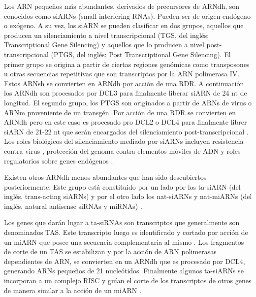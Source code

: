 Los ARN pequeños más abundantes, derivados de precursores de ARNdh, son conocidos como siARNs (small interfering RNAs). 
Pueden ser de origen endógeno o exógeno.
A su vez, los siARN se pueden clasificar en dos grupos, aquellos que producen un silenciamiento a nivel transcripcional (TGS, del inglés: Transcriptional Gene Silencing) \citep{pmid17943195, Voinnet2009669} y aquellos que lo producen a nivel post-transcripcional (PTGS, del inglés: Post Transcriptional Gene Silencing)\citep{pmid10542148}. 
El primer grupo se origina a partir de ciertas regiones genómicas como transposones u otras secuencias repetitivas que son transcriptos por la ARN polimerasa IV.
Estos ARNsh se convierten en ARNdh por acción de una RDR. 
A continuación los ARNdh son procesados por DCL3 para finalmente liberar siARN de 24 nt de longitud.
El segundo grupo, los PTGS son originados a partir de ARNs de virus o ARNm proveniente de un transgén. 
Por acción de una RDR se convierten en ARNdh pero en este caso es procesado pro DCL2 o DCL4 para finalmente librer siARN de 21-22 nt que serán encargados del silenciamiento post-transcripcional \citep{pmid18358247}.
Los roles biológicos del silenciamiento mediado por siARNs incluyen resistencia contra virus \citep{pmid11485817}, protección del genoma contra elementos móviles de ADN y roles regulatorios sobre genes endógenos \citep{pmid15372043, pmid17943195, Voinnet2009669}.

Existen otros ARNdh menos abundantes que han sido descubiertos posteriormente.
Este grupo está constituido por un lado por los ta-siARN (del inglés, trans-acting siARNs) y por el otro lado los nat-siARNs y nat-miARNs (del inglés, natural antisense siRNAs y miRNAs) \citep{pmid17943195, pmid18501663, pmid16600909,Voinnet2009669}.

Los genes que darán lugar a ta-siRNAs son transcriptos que generalmente son denominados TAS.
Este transcripto luego es identificado y cortado por acción de un miARN que posee una secuencia complementaria al mismo \citep{Allen2005207}.
Los fragmentos de corte de un TAS se estabilizan y por la acción de ARN polimerasas dependientes de ARN, se convierten en un ARNdh que es procesado por DCL4, generando ARNs pequeños de 21 nucleótidos.
Finalmente algunos ta-siARNs se incorporan a un complejo RISC y guían el corte de los transcriptos de otros genes de manera similar a la acción de un miARN \citep{Allen2005207,pmid16040244,pmid16131612,Xie2005a}.


